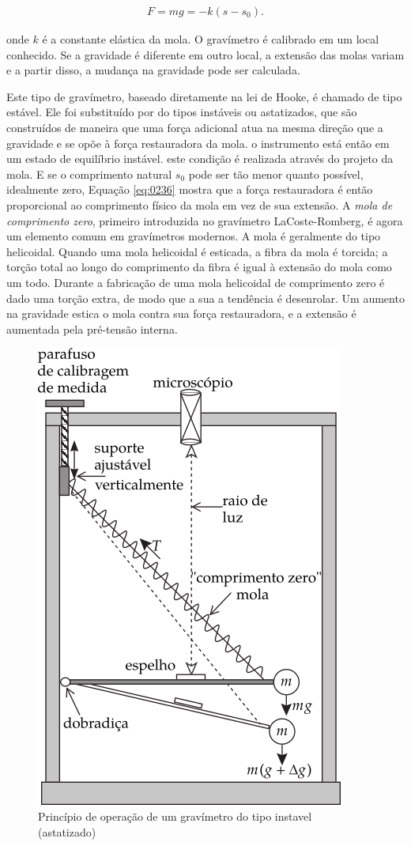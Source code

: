 \documentclass[]{book}
\theoremstyle{definition}
\theoremstyle{definition}
\theoremstyle{definition}
\theoremstyle{remark}
\begin{document}
\begin{align}
F=m g=-k\left(s-s_{0}\right). \label{eq:0236}
\end{align}

onde \(k\) é a constante elástica da mola. O gravímetro é calibrado em um local conhecido. Se a gravidade é diferente em outro local, a extensão das molas variam e a partir disso, a mudança na gravidade pode ser calculada.

Este tipo de gravímetro, baseado diretamente na lei de Hooke, é chamado de tipo estável. Ele foi substituído por do tipos instáveis ou astatizados, que são construídos de maneira que uma força adicional atua na mesma direção que a gravidade e se opõe à força restauradora da mola. o instrumento está então em um estado de equilíbrio instável. este condição é realizada através do projeto da mola. E se o comprimento natural \(s_0\) pode ser tão menor quanto possível, idealmente zero, Equação \eqref{eq:0236} mostra que a força restauradora é então proporcional ao comprimento físico da mola em vez de sua extensão. A \emph{mola de comprimento zero}, primeiro introduzida no gravímetro LaCoste-Romberg, é agora um elemento comum em gravímetros modernos. A mola é geralmente do tipo helicoidal. Quando uma mola helicoidal é esticada, a fibra da mola é torcida; a torção total ao longo do comprimento da fibra é igual à extensão do mola como um todo. Durante a fabricação de uma mola helicoidal de comprimento zero é dado uma torção extra, de modo que a sua a tendência é desenrolar. Um aumento na gravidade estica o mola contra sua força restauradora, e a extensão é aumentada pela pré-tensão interna.

\begin{figure}

{\centering \includegraphics[width=0.4\linewidth]{fig/Fig_02.27} 

}

\caption{Princípio de operação de um gravímetro do tipo instavel (astatizado)}\label{fig:gravimetro}
\end{figure}
\end{document}
